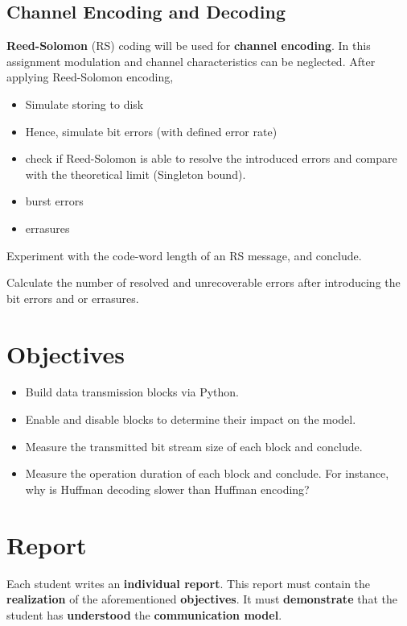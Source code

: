 \documentclass[12pt,a4paper]{article}
\begin{document}
\subsection{Channel Encoding and Decoding}
\textbf{Reed-Solomon} (RS) coding will be used for \textbf{channel encoding}. 
In this assignment modulation and channel characteristics can be neglected.
After applying Reed-Solomon encoding, 
\begin{itemize}
	\item Simulate storing to disk
	\item Hence, simulate bit errors (with defined error rate)
	\item check if Reed-Solomon is able to resolve the introduced errors and compare with the theoretical limit (Singleton bound).
	\item burst errors
	\item errasures
\end{itemize}

\begin{question}
	Experiment with the code-word length of an RS message, and conclude.%
\end{question}

\begin{question}
	Calculate the number of resolved and unrecoverable errors after introducing the bit errors and or errasures.
\end{question}
 

\section{Objectives}
\begin{itemize}
	\item Build data transmission blocks via Python.%
	\item Enable and disable blocks to determine their impact on the model.%
	\item Measure the transmitted bit stream size of each block and conclude.
	\item Measure the operation duration of each block and conclude.
	For instance, why is Huffman decoding slower than Huffman encoding?
\end{itemize}

\section{Report}
Each student writes an \textbf{individual report}. This report must contain the \textbf{realization} of the aforementioned \textbf{objectives}. It must \textbf{demonstrate} that the student has \textbf{understood} the \textbf{communication model}. 
\end{document}
